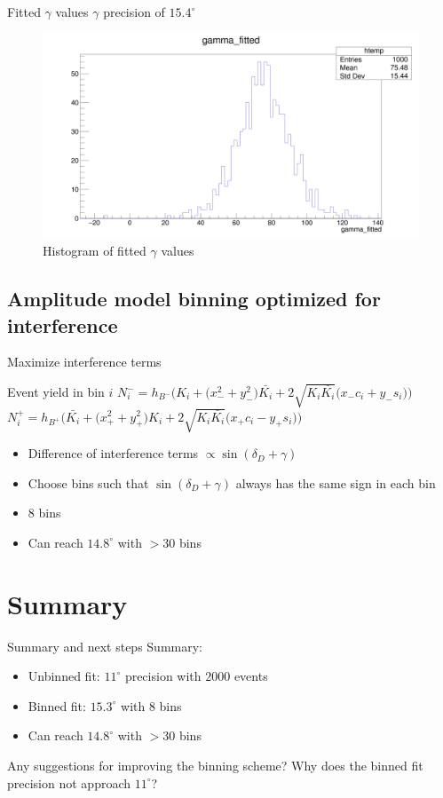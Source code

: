 \documentclass{beamer}
\begin{document}
\begin{frame}{Fitted $\gamma$ values}
  $\gamma$ precision of $15.4^\circ$
  \begin{figure}
    \centering
    \includegraphics[width = 1.0\textwidth]{AmplitudePulls/gammafitted1K1K.png}
    \caption{Histogram of fitted $\gamma$ values}
  \end{figure}
\end{frame}

\subsection{Amplitude model binning optimized for interference}
\begin{frame}{Maximize interference terms}
  \begin{block}{Event yield in bin $i$}
    $N^-_i = h_{B^-}\Big(K_i + \big(x_-^2 + y_-^2\big)\bar{K_i} + 2\sqrt{K_i\bar{K_i}}\big(x_-c_i + y_-s_i\big)\Big)$
    $N^+_i = h_{B^+}\Big(\bar{K_i} + \big(x_+^2 + y_+^2\big)K_i + 2\sqrt{K_i\bar{K_i}}\big(x_+c_i - y_+s_i\big)\Big)$
  \end{block}
  \begin{itemize}
    \item{Difference of interference terms $\propto\sin(\delta_D + \gamma)$}
    \item{Choose bins such that $\sin(\delta_D + \gamma)$ always has the same sign in each bin}
    \item{$8$ bins}
    \item{Can reach $14.8^\circ$ with $>30$ bins}
  \end{itemize}
\end{frame}

\section{Summary}
\begin{frame}{Summary and next steps}
  Summary:
  \begin{itemize}
    \item{Unbinned fit: $11^\circ$ precision with $2000$ events}
    \item{Binned fit: $15.3^\circ$ with $8$ bins}
    \item{Can reach $14.8^\circ$ with $>30$ bins}
  \end{itemize}
  Any suggestions for improving the binning scheme?
  Why does the binned fit precision not approach $11^\circ$?
\end{frame}
\end{document}
